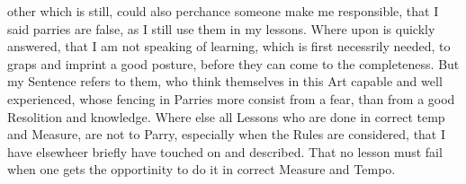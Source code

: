 \newpage


\newpage


other which is still, could also perchance someone make me
responsible, that I said parries are false, as I still use them in my
lessons. Where upon is quickly answered, that I am not speaking of
learning, which is first necessrily needed, to graps and imprint a
good posture, before they can come to the completeness.
But my Sentence refers to them, who think themselves in this Art
capable and well experienced, whose fencing in Parries more consist
from a fear, than from a good Resolition and knowledge. Where else all
Lessons who are done in correct temp and Measure,
are not to Parry, especially when the Rules are considered, that I
have elsewheer briefly have touched on and described. That no lesson
must fail when one gets the opportinity to do it in correct Measure
and Tempo.
